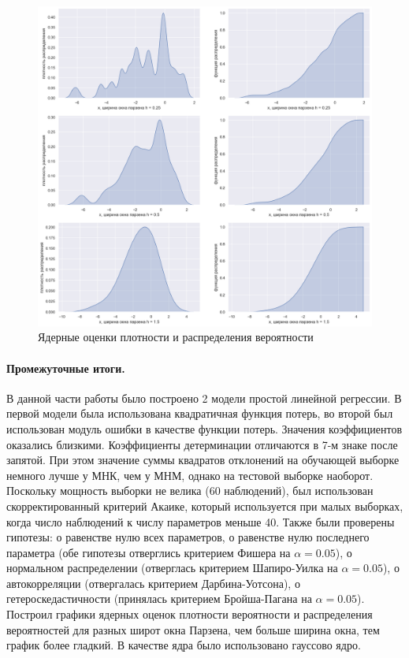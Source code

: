 \documentclass[a4paper,12pt]{article}
\begin{document}
\begin{figure}[H]
    \includegraphics[width=\linewidth]{src/img/ядерные_оценки.png}
    \caption{Ядерные оценки плотности и распределения вероятности}
\end{figure}


\paragraph{Промежуточные итоги.\\}

В данной части работы было построено 2 модели простой линейной регрессии. В первой модели была использована квадратичная функция потерь, во второй был использован модуль ошибки в качестве функции потерь. Значения коэффициентов оказались близкими. Коэффициенты детерминации отличаются в 7-м знаке после запятой. При этом значение суммы квадратов отклонений на обучающей выборке немного лучше у МНК, чем у МНМ, однако на тестовой выборке наоборот. Поскольку мощность выборки не велика (60 наблюдений), был использован скорректированный критерий Акаике, который используется при малых выборках, когда число наблюдений к числу параметров меньше 40. Также были проверены гипотезы: о равенстве нулю всех параметров, о равенстве нулю последнего параметра (обе гипотезы отверглись критерием Фишера на $\alpha = 0.05$), о нормальном распределении (отверглась критерием Шапиро-Уилка на $\alpha = 0.05$), о автокорреляции (отвергалась критерием Дарбина-Уотсона), о гетероскедастичности (принялась критерием Бройша-Пагана на $\alpha = 0.05$). Построил графики ядерных оценок плотности вероятности и распределения вероятностей для разных широт окна Парзена, чем больше ширина окна, тем график более гладкий. В качестве ядра было использовано гауссово ядро.
\end{document}
